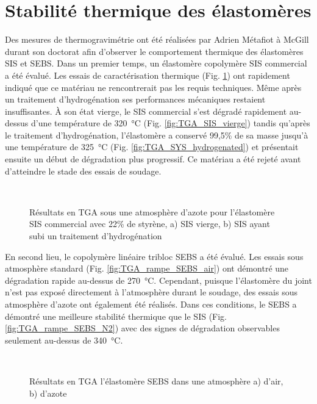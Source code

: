 \section{Stabilité thermique des élastomères}

Des mesures de thermogravimétrie ont été réalisées par Adrien Métafiot à McGill durant son doctorat afin d'observer le comportement thermique des élastomères SIS et SEBS. 
Dans un premier temps, un élastomère copolymère SIS commercial a été évalué. 
Les essais de caractérisation thermique (Fig. \ref{fig:TGA_SIS}) ont rapidement indiqué que ce matériau ne rencontrerait pas les requis techniques. 
Même après un traitement d'hydrogénation ses performances mécaniques restaient insuffisantes. 
À son état vierge, le SIS commercial s'est dégradé rapidement au-dessus d'une température de \SI[locale=FR]{320}{\celsius} (Fig. \ref{fig:TGA_SIS_vierge}) tandis qu'après le traitement d'hydrogénation, l'élastomère a conservé 99,5\% de sa masse jusqu'à une température de \SI[locale=FR]{325}{\celsius} (Fig. \ref{fig:TGA_SYS_hydrogenated}) et présentait ensuite un début de dégradation plus progressif.  
Ce matériau a été rejeté avant d'atteindre le stade des essais de soudage. 

\begin{figure}[h]
	\centering
	\\
	\caption{Résultats en TGA sous une atmosphère d'azote pour l'élastomère SIS commercial avec 22\% de styrène, a) SIS vierge, b) SIS ayant subi un traitement d'hydrogénation}
	\label{fig:TGA_SIS}
\end{figure}

En second lieu, le copolymère linéaire tribloc SEBS a été évalué. 
Les essais sous atmosphère standard (Fig. \ref{fig:TGA_rampe_SEBS_air}) ont démontré une dégradation rapide au-dessus de \SI[locale=FR]{270}{\celsius}. 
Cependant, puisque l'élastomère du joint n'est pas exposé directement à l'atmosphère durant le soudage, des essais sous atmosphère d'azote ont également été réalisés. 
Dans ces conditions, le SEBS a démontré une meilleure stabilité thermique que le SIS (Fig. \ref{fig:TGA_rampe_SEBS_N2}) avec des signes de dégradation observables seulement au-dessus de \SI[locale=FR]{340}{\celsius}. 

\begin{figure}[h]
	\centering
	\\
	\caption{Résultats en TGA l'élastomère SEBS dans une atmosphère a) d'air, b) d'azote}
	\label{fig:TGA_rampe_SEBS}
\end{figure}

